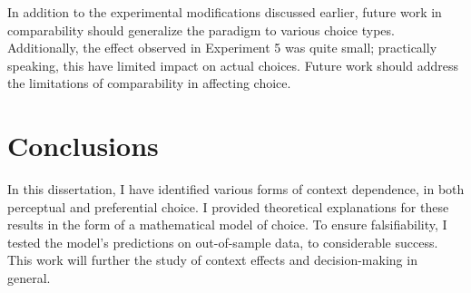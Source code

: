 In addition to the experimental modifications discussed earlier, future work in comparability should generalize the paradigm to various choice types. Additionally, the effect observed in Experiment 5 was quite small; practically speaking, this have limited impact on actual choices. Future work should address the limitations of comparability in affecting choice.

\section{Conclusions}
In this dissertation, I have identified various forms of context dependence, in both perceptual and preferential choice. I provided theoretical explanations for these results in the form of a mathematical model of choice. To ensure falsifiability, I tested the model's predictions on out-of-sample data, to considerable success. This work will further the study of context effects and decision-making in general. 